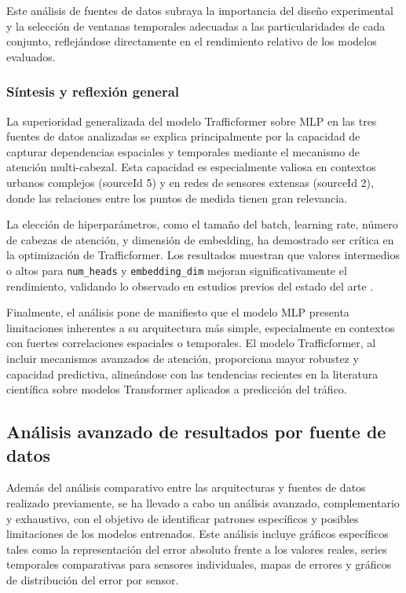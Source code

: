 Este análisis de fuentes de datos subraya la importancia del diseño experimental y la selección de ventanas temporales adecuadas a las particularidades de cada conjunto, reflejándose directamente en el rendimiento relativo de los modelos evaluados.

\subsubsection*{Síntesis y reflexión general}

La superioridad generalizada del modelo Trafficformer sobre MLP en las tres fuentes de datos analizadas se explica principalmente por la capacidad de capturar dependencias espaciales y temporales mediante el mecanismo de atención multi-cabezal. Esta capacidad es especialmente valiosa en contextos urbanos complejos (sourceId 5) y en redes de sensores extensas (sourceId 2), donde las relaciones entre los puntos de medida tienen gran relevancia.

La elección de hiperparámetros, como el tamaño del batch, learning rate, número de cabezas de atención, y dimensión de embedding, ha demostrado ser crítica en la optimización de Trafficformer. Los resultados muestran que valores intermedios o altos para \texttt{num\_heads} y \texttt{embedding\_dim} mejoran significativamente el rendimiento, validando lo observado en estudios previos del estado del arte \cite{trafficformer}.

Finalmente, el análisis pone de manifiesto que el modelo MLP presenta limitaciones inherentes a su arquitectura más simple, especialmente en contextos con fuertes correlaciones espaciales o temporales. El modelo Trafficformer, al incluir mecanismos avanzados de atención, proporciona mayor robustez y capacidad predictiva, alineándose con las tendencias recientes en la literatura científica sobre modelos Transformer aplicados a predicción del tráfico.

\subsection{Análisis avanzado de resultados por fuente de datos}
\label{sec:analisis_avanzado_resultados}

Además del análisis comparativo entre las arquitecturas y fuentes de datos realizado previamente, se ha llevado a cabo un análisis avanzado, complementario y exhaustivo, con el objetivo de identificar patrones específicos y posibles limitaciones de los modelos entrenados. Este análisis incluye gráficos específicos tales como la representación del error absoluto frente a los valores reales, series temporales comparativas para sensores individuales, mapas de errores y gráficos de distribución del error por sensor.


